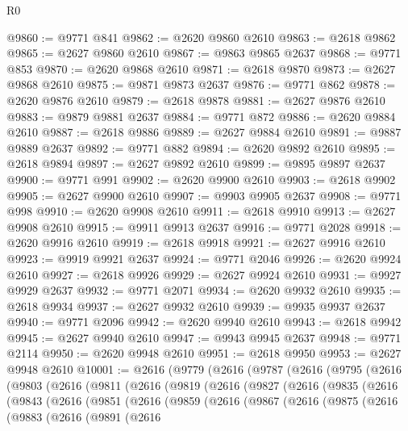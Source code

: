 \begin{lexlean}{R0}
\begin{coremodule}
@9860 := @9771 @841
@9862 := @2620 @9860 @2610
@9863 := @2618 @9862
@9865 := @2627 @9860 @2610
@9867 := @9863 @9865 @2637
@9868 := @9771 @853
@9870 := @2620 @9868 @2610
@9871 := @2618 @9870
@9873 := @2627 @9868 @2610
@9875 := @9871 @9873 @2637
@9876 := @9771 @862
@9878 := @2620 @9876 @2610
@9879 := @2618 @9878
@9881 := @2627 @9876 @2610
@9883 := @9879 @9881 @2637
@9884 := @9771 @872
@9886 := @2620 @9884 @2610
@9887 := @2618 @9886
@9889 := @2627 @9884 @2610
@9891 := @9887 @9889 @2637
@9892 := @9771 @882
@9894 := @2620 @9892 @2610
@9895 := @2618 @9894
@9897 := @2627 @9892 @2610
@9899 := @9895 @9897 @2637
@9900 := @9771 @991
@9902 := @2620 @9900 @2610
@9903 := @2618 @9902
@9905 := @2627 @9900 @2610
@9907 := @9903 @9905 @2637
@9908 := @9771 @998
@9910 := @2620 @9908 @2610
@9911 := @2618 @9910
@9913 := @2627 @9908 @2610
@9915 := @9911 @9913 @2637
@9916 := @9771 @2028
@9918 := @2620 @9916 @2610
@9919 := @2618 @9918
@9921 := @2627 @9916 @2610
@9923 := @9919 @9921 @2637
@9924 := @9771 @2046
@9926 := @2620 @9924 @2610
@9927 := @2618 @9926
@9929 := @2627 @9924 @2610
@9931 := @9927 @9929 @2637
@9932 := @9771 @2071
@9934 := @2620 @9932 @2610
@9935 := @2618 @9934
@9937 := @2627 @9932 @2610
@9939 := @9935 @9937 @2637
@9940 := @9771 @2096
@9942 := @2620 @9940 @2610
@9943 := @2618 @9942
@9945 := @2627 @9940 @2610
@9947 := @9943 @9945 @2637
@9948 := @9771 @2114
@9950 := @2620 @9948 @2610
@9951 := @2618 @9950
@9953 := @2627 @9948 @2610
@10001 := @2616
    (@9779
      (@2616
        (@9787
          (@2616
            (@9795
              (@2616
                (@9803
                  (@2616
                    (@9811
                      (@2616
                        (@9819
                          (@2616
                            (@9827
                              (@2616
                                (@9835
                                  (@2616
                                    (@9843
                                      (@2616
                                        (@9851
                                          (@2616
                                            (@9859
                                              (@2616
                                                (@9867
                                                  (@2616
                                                    (@9875
                                                      (@2616
                                                        (@9883
                                                          (@2616
                                                            (@9891
                                                              (@2616

\end{coremodule}
\end{lexlean}
